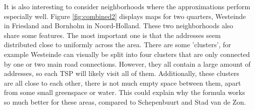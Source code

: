 It is also interesting to consider neighborhoods where the approximations perform especially well. Figure \ref{fig:combined2} displays maps for two quarters,
Westeinde in Friesland and Bornholm in Noord-Holland. These two neighborhoods also share some features. The most important one is that the addresses seem
distributed close to uniformly across the area. There are some 'clusters', for example Westeinde can visually be split into four clusters that are only
connected by one or two main road connections. However, they all contain a large amount of addresses, so each TSP will likely visit all of them. Additionally,
these clusters are all close to each other, there is not much empty space between them, apart from some small greenspace or water. This could explain why the
formula works so much better for these areas, compared to Schepenbuurt and Stad van de Zon.
